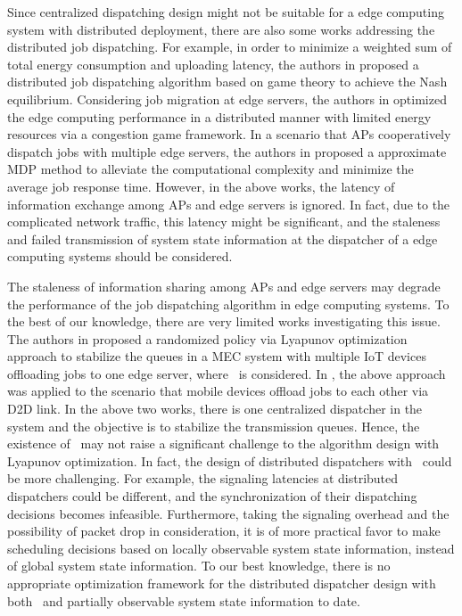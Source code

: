 Since centralized dispatching design might not be suitable for a edge computing system with distributed deployment, there are also some works addressing the distributed job dispatching.
For example, in order to minimize a weighted sum of total energy consumption and uploading latency, the authors in \cite{ToN-Xuchen2016} proposed a distributed job dispatching algorithm based on game theory to achieve the Nash equilibrium. 
Considering job migration at edge servers, the authors in \cite{ToN-xujie2018} optimized the edge computing performance in a distributed manner with limited energy resources via a congestion game framework.
In a scenario that APs cooperatively dispatch jobs with multiple edge servers, the authors in \cite{mdp-jcin} proposed a approximate MDP method to alleviate the computational complexity and minimize the average job response time.
However, in the above works, the latency of information exchange among APs and edge servers is ignored.
In fact, due to the complicated network traffic, this latency might be significant, and the staleness {and failed transmission} of system state information at the dispatcher of a edge computing systems should be considered.

The staleness of information sharing among APs and edge servers may degrade the performance of the job dispatching algorithm in edge computing systems.
To the best of our knowledge, there are very limited works investigating this issue.
The authors in \cite{JSAC17-LyuX} proposed a randomized policy via Lyapunov optimization approach to stabilize the queues in a MEC system with multiple IoT devices offloading jobs to one edge server, where \brlatency~is considered. 
In \cite{TWC18-LyuX}, the above approach was applied to the scenario that mobile devices offload jobs to each other via D2D link.
In the above two works, there is one centralized dispatcher in the system and the objective is to stabilize the transmission queues.
Hence, the existence of \brlatency~may not raise a significant challenge to the algorithm design with Lyapunov optimization.
In fact, the design of distributed dispatchers with \brlatency~could be more challenging.
For example, the signaling latencies at distributed dispatchers could be different, and the synchronization of their dispatching decisions becomes infeasible.
Furthermore, taking the signaling overhead and the possibility of packet drop in consideration, it is of more practical favor to make scheduling decisions based on locally observable system state information, instead of global system state information.
To our best knowledge, there is no appropriate optimization framework for the distributed dispatcher design with both \brlatency~and partially observable system state information to date.

